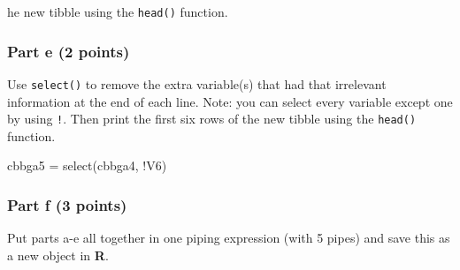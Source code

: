 \documentclass[
  letterpaper,
  DIV=11,
  numbers=noendperiod]{scrartcl}
\newenvironment{Shaded}{\begin{snugshade}}{\end{snugshade}}
\newcommand{\AttributeTok}[1]{\textcolor[rgb]{0.40,0.45,0.13}{#1}}
\newcommand{\FunctionTok}[1]{\textcolor[rgb]{0.28,0.35,0.67}{#1}}
\newcommand{\NormalTok}[1]{\textcolor[rgb]{0.00,0.23,0.31}{#1}}
\newcommand{\OtherTok}[1]{\textcolor[rgb]{0.00,0.23,0.31}{#1}}
\newcommand{\SpecialCharTok}[1]{\textcolor[rgb]{0.37,0.37,0.37}{#1}}
\newcommand{\StringTok}[1]{\textcolor[rgb]{0.13,0.47,0.30}{#1}}
\begin{document}
he new tibble using the \texttt{head()} function.

\subsubsection{Part e (2 points)}\label{part-e-2-points}

Use \texttt{select()} to remove the extra variable(s) that had that
irrelevant information at the end of each line. Note: you can select
every variable except one by using \texttt{!}. Then print the first six
rows of the new tibble using the \texttt{head()} function.

\begin{Shaded}
\begin{Highlighting}[]
\NormalTok{cbbga5 }\OtherTok{=} \FunctionTok{select}\NormalTok{(cbbga4, }\SpecialCharTok{!}\NormalTok{V6)}
\end{Highlighting}
\end{Shaded}

\subsubsection{Part f (3 points)}\label{part-f-3-points}

Put parts a-e all together in one piping expression (with 5 pipes) and
save this as a new object in \textbf{R}.

\begin{Shaded}
\end{Shaded}
\end{document}
